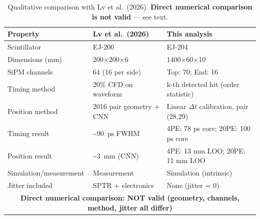\begin{table}[htbp]
\centering
\small
\caption{Qualitative comparison with Lv et al.\ (2026). \textbf{Direct numerical comparison is not valid} — see text.}
\label{tab:lv_comparison}
\begin{tabular}{lp{4.5cm}p{4.5cm}}
\toprule
\textbf{Property} & \textbf{Lv et al.\ (2026)} & \textbf{This analysis} \\
\midrule
Scintillator & EJ-200 & EJ-204 \\
Dimensions (mm) & 200×200×6 & 1400×60×10 \\
SiPM channels & 64 (16 per side) & Top: 70; End: 16 \\
Timing method & 20\% CFD on waveform & k-th detected hit (order statistic) \\
Position method & 2016 pair geometry + CNN & Linear $\Delta t$ calibration, pair (28,29) \\
Timing result & \textasciitilde{}90~ps FWHM & 4PE: 78 ps core; 20PE: 100 ps core \\
Position result & \textasciitilde{}3~mm (CNN) & 4PE: 13 mm LOO; 20PE: 11 mm LOO \\
Simulation/measurement & Measurement & Simulation (intrinsic) \\
Jitter included & SPTR + electronics & None (jitter = 0) \\
\midrule
\multicolumn{3}{c}{\textbf{Direct numerical comparison: NOT valid (geometry, channels, method, jitter all differ)}} \\
\bottomrule
\end{tabular}
\end{table}
